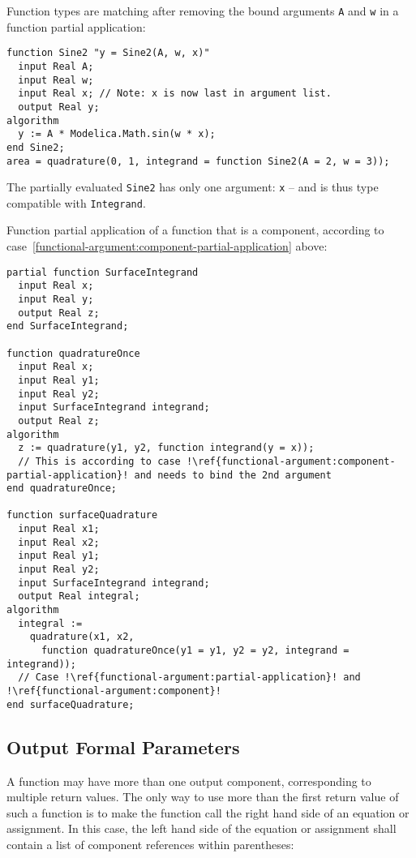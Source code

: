 \begin{example}
Function types are matching after removing the bound arguments \lstinline!A! and \lstinline!w! in a function partial
application:
\begin{lstlisting}[language=modelica]
function Sine2 "y = Sine2(A, w, x)"
  input Real A;
  input Real w;
  input Real x; // Note: x is now last in argument list.
  output Real y;
algorithm
  y := A * Modelica.Math.sin(w * x);
end Sine2;
area = quadrature(0, 1, integrand = function Sine2(A = 2, w = 3));
\end{lstlisting}
The partially evaluated \lstinline!Sine2! has only one argument: \lstinline!x! -- and is thus type compatible with \lstinline!Integrand!.
\end{example}

\begin{example}
Function partial application of a function that is a component, according to case~\ref{functional-argument:component-partial-application} above:
\begin{lstlisting}[language=modelica,escapechar=!]
partial function SurfaceIntegrand
  input Real x;
  input Real y;
  output Real z;
end SurfaceIntegrand;

function quadratureOnce
  input Real x;
  input Real y1;
  input Real y2;
  input SurfaceIntegrand integrand;
  output Real z;
algorithm
  z := quadrature(y1, y2, function integrand(y = x));
  // This is according to case !\ref{functional-argument:component-partial-application}! and needs to bind the 2nd argument
end quadratureOnce;

function surfaceQuadrature
  input Real x1;
  input Real x2;
  input Real y1;
  input Real y2;
  input SurfaceIntegrand integrand;
  output Real integral;
algorithm
  integral :=
    quadrature(x1, x2,
      function quadratureOnce(y1 = y1, y2 = y2, integrand = integrand));
  // Case !\ref{functional-argument:partial-application}! and !\ref{functional-argument:component}!
end surfaceQuadrature;
\end{lstlisting}
\end{example}


\subsection{Output Formal Parameters}\label{output-formal-parameters-of-functions}

A function may have more than one output component, corresponding to multiple return values.
The only way to use more than the first return value of such a function is to make the function call the right hand side of an equation or assignment.
In this case, the left hand side of the equation or assignment shall contain a list of component references within parentheses:

